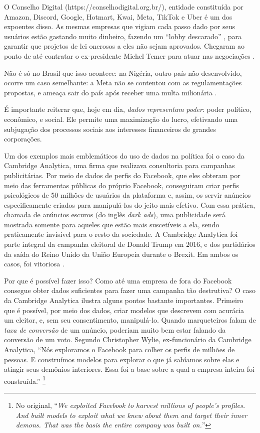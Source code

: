 O Conselho Digital (https://conselhodigital.org.br/), entidade constituída por Amazon, Discord, Google, Hotmart, Kwai, Meta, TikTok e Uber é um dos expoentes disso.
As mesmas empresas que vigiam cada passo dado por seus usuários estão gastando muito dinheiro, fazendo um ``lobby descarado'' \cite{detoledo_pl_2023}, para garantir que projetos de lei onerosos a eles não sejam aprovados.
Chegaram ao ponto de até contratar o ex-presidente Michel Temer para atuar nas negociações \cite{mello_google_2023}.

Não é só no Brasil que isso acontece: na Nigéria, outro país não desenvolvido, ocorre um caso semelhante: a Meta não se contentou com as regulamentações propostas, e ameaça sair do país após receber uma multa milionária \cite{asadu_nigeria_2024}.

É importante reiterar que, hoje em dia, \textit{dados representam poder}: poder político, econômico, e social.
Ele permite uma maximização do lucro, efetivando uma subjugação dos processos sociais aos interesses financeiros de grandes corporações.

Um dos exemplos mais emblemáticos do uso de dados na política foi o caso da Cambridge Analytica, uma firma que realizava consultoria para campanhas publicitárias.
Por meio de dados de perfis do Facebook, que eles obteram por meio das ferramentas públicas do próprio Facebook, conseguiram criar perfis psicológicos de 50 milhões de usuários da plataforma e, assim, os servir anúncios especificamente criados para manipulá-los do jeito mais efetivo.
Com essa prática, chamada de anúncios escuros (do inglês \textit{dark ads}), uma publicidade será mostrada somente para aqueles que estão mais suscetíveis a ela, sendo praticamente invisível para o resto da sociedade.
A Cambridge Analytica foi parte integral da campanha eleitoral de Donald Trump em 2016, e dos partidários da saída do Reino Unido da União Europeia durante o Brexit.
Em ambos os casos, foi vitoriosa \cite{cadwalladr_50_2018}.

Por que é possível fazer isso?
Como até uma empresa de fora do Facebook consegue obter dados suficientes para fazer uma campanha tão destrutiva?
O caso da Cambridge Analytica ilustra alguns pontos bastante importantes.
Primeiro que é possível, por meio dos dados, criar modelos que descrevem com acurácia um eleitor, e, sem seu consentimento, manipulá-lo.
Quando marqueteiros falam de \textit{taxa de conversão} de um anúncio, poderiam muito bem estar falando da conversão de um voto.
Segundo Christopher Wylie, ex-funcionário da Cambridge Analytica, 
``Nós exploramos o Facebook para colher os perfis de milhões de pessoas. E construímos modelos para explorar o que já sabíamos sobre elas e atingir seus demônios interiores. Essa foi a base sobre a qual a empresa inteira foi construída.''
\cite[tradução~própria]{cadwalladr_50_2018}\footnote{No original, ``\textit{We exploited Facebook to harvest millions of people’s profiles. And built models to exploit what we knew about them and target their inner demons. That was the basis the entire company was built on.}''}

